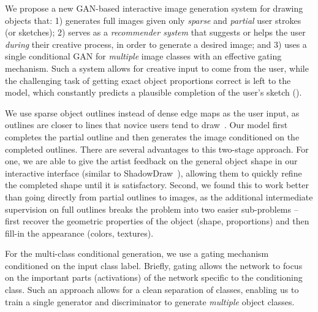We propose a new GAN-based interactive image generation system for drawing objects that: 1) generates full images given only {\em sparse} and {\em partial} user strokes (or sketches); 2) serves as a \emph{recommender system} that suggests or helps the user \emph{during} their creative process, in order to generate a desired image; and 3) uses a single conditional GAN for {\em multiple} image classes with an effective gating mechanism. Such a system allows for creative input to come from the user, while the challenging task of getting exact object proportions correct is left to the model, which constantly predicts a plausible completion of the user's sketch (). %

We use sparse object outlines instead of dense edge maps as the user input, as outlines are closer to lines that novice users tend to draw~\cite{cole2008people}. 
Our model first completes the partial outline and then generates the image conditioned on the completed outlines. There are several advantages to this two-stage approach.
For one, we are able to give the artist feedback on the general object shape in our interactive interface (similar to ShadowDraw~\cite{lee2011shadowdraw}), allowing them to quickly refine the completed shape until it is satisfactory.
Second, we found this to work better than going directly from partial outlines to images, as the additional intermediate supervision on full outlines breaks the problem into two easier sub-problems -- first recover the geometric properties of the object (shape, proportions) and then fill-in the appearance (colors, textures). 



For the multi-class conditional generation, we use a gating mechanism conditioned on the input class label. Briefly, gating allows the network to focus on the important parts (activations) of the network specific to the conditioning class. Such an approach allows for a clean separation of classes, enabling us to train a single generator and discriminator to  generate \emph{multiple} object classes. %

